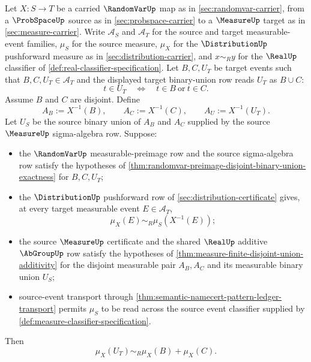 \begin{theorem}
\label{thm:distribution-pushforward-finite-disjoint-union-additivity}
Let $X:S\to T$ be a carried $\RandomVarUp$ map as in \autoref{sec:randomvar-carrier}, from a $\ProbSpaceUp$ source as in \autoref{sec:probspace-carrier} to a $\MeasureUp$ target as in \autoref{sec:measure-carrier}. Write $\mathcal{A}_S$ and $\mathcal{A}_T$ for the source and target measurable-event families, $\mu_S$ for the source measure, $\mu_X$ for the $\DistributionUp$ pushforward measure as in \autoref{sec:distribution-carrier}, and $x\sim_R y$ for the $\RealUp$ classifier of \autoref{def:real-classifier-specification}. Let $B,C,U_T$ be target events such that $B,C,U_T\in\mathcal{A}_T$ and the displayed target binary-union row reads $U_T$ as $B\cup C$:
$$
t\in U_T\quad\Longleftrightarrow\quad t\in B\ \text{or}\ t\in C.
$$
Assume $B$ and $C$ are disjoint. Define
$$
A_B:=X^{-1}(B),\qquad A_C:=X^{-1}(C),\qquad A_U:=X^{-1}(U_T).
$$
Let $U_S$ be the source binary union of $A_B$ and $A_C$ supplied by the source $\MeasureUp$ sigma-algebra row. Suppose:
\begin{itemize}
\item the $\RandomVarUp$ measurable-preimage row and the source sigma-algebra row satisfy the hypotheses of \autoref{thm:randomvar-preimage-disjoint-binary-union-exactness} for $B,C,U_T$;
\item the $\DistributionUp$ pushforward row of \autoref{sec:distribution-certificate} gives, at every target measurable event $E\in\mathcal{A}_T$,
$$
\mu_X(E)\sim_R\mu_S(X^{-1}(E));
$$
\item the source $\MeasureUp$ certificate and the shared $\RealUp$ additive $\AbGroupUp$ row satisfy the hypotheses of \autoref{thm:measure-finite-disjoint-union-additivity} for the disjoint measurable pair $A_B,A_C$ and its measurable binary union $U_S$;
\item source-event transport through \autoref{thm:semantic-namecert-pattern-ledger-transport} permits $\mu_S$ to be read across the source event classifier supplied by \autoref{def:measure-classifier-specification}.
\end{itemize}
Then
$$
\mu_X(U_T)\sim_R\mu_X(B)+\mu_X(C).
$$
\end{theorem}
